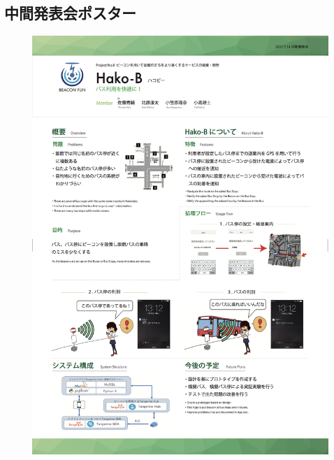 \documentclass[openany,11pt,papersize]{jsbook}
\begin{document}
\begin{appendix}
\chapter{中間発表会ポスター}
\begin{figure}[htbp]
  \begin{center}
    \includegraphics[clip,width=14cm]{img/poster.png}
    \label{fig:poster}
  \end{center}
\end{figure}


\end{appendix}
\end{document}
